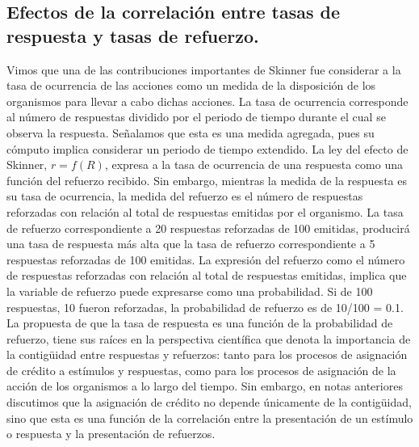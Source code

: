 \documentclass[
  letterpaper,
]{book}
\begin{document}
\subsection{Efectos de la correlación entre tasas de respuesta y tasas
de
refuerzo.}\label{efectos-de-la-correlaciuxf3n-entre-tasas-de-respuesta-y-tasas-de-refuerzo.}

Vimos que una de las contribuciones importantes de Skinner fue
considerar a la tasa de ocurrencia de las acciones como un medida de la
disposición de los organismos para llevar a cabo dichas acciones. La
tasa de ocurrencia corresponde al número de respuestas dividido por el
periodo de tiempo durante el cual se observa la respuesta. Señalamos que
esta es una medida agregada, pues su cómputo implica considerar un
periodo de tiempo extendido. La ley del efecto de Skinner, \(r=f(R)\),
expresa a la tasa de ocurrencia de una respuesta como una función del
refuerzo recibido. Sin embargo, mientras la medida de la respuesta es su
tasa de ocurrencia, la medida del refuerzo es el número de respuestas
reforzadas con relación al total de respuestas emitidas por el
organismo. La tasa de refuerzo correspondiente a 20 respuestas
reforzadas de 100 emitidas, producirá una tasa de respuesta más alta que
la tasa de refuerzo correspondiente a 5 respuestas reforzadas de 100
emitidas. La expresión del refuerzo como el número de respuestas
reforzadas con relación al total de respuestas emitidas, implica que la
variable de refuerzo puede expresarse como una probabilidad. Si de 100
respuestas, 10 fueron reforzadas, la probabilidad de refuerzo es de
10/100 = 0.1. La propuesta de que la tasa de respuesta es una función de
la probabilidad de refuerzo, tiene sus raíces en la perspectiva
científica que denota la importancia de la contigüidad entre respuestas
y refuerzos: tanto para los procesos de asignación de crédito a
estímulos y respuestas, como para los procesos de asignación de la
acción de los organismos a lo largo del tiempo. Sin embargo, en notas
anteriores discutimos que la asignación de crédito no depende únicamente
de la contigüidad, sino que esta es una función de la correlación entre
la presentación de un estímulo o respuesta y la presentación de
refuerzos.
\end{document}
